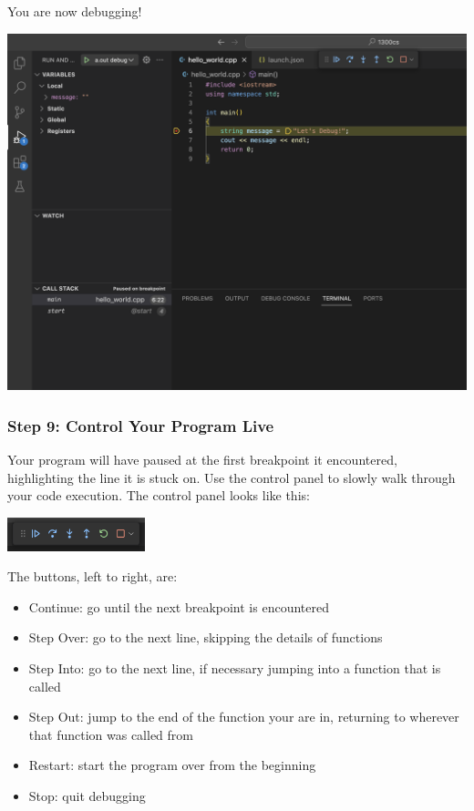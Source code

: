 You are now debugging!

\includegraphics[width=\textwidth]{images/macDebuggerSetup/debugger_mac_9.png}

\subsubsection{Step 9: Control Your Program Live}

Your program will have paused at the first breakpoint it encountered, highlighting the line it is stuck on. Use the control panel to slowly walk through your code execution. The control panel looks like this:

\includegraphics[width=0.3\textwidth]{images/macDebuggerSetup/debugger_mac_10.png}

The buttons, left to right, are:

\begin{itemize}
    \item Continue: go until the next breakpoint is encountered
    \item Step Over: go to the next line, skipping the details of functions
    \item Step Into: go to the next line, if necessary jumping into a function that is called
    \item Step Out: jump to the end of the function your are in, returning to wherever that function was called from
    \item Restart: start the program over from the beginning
    \item Stop: quit debugging
\end{itemize}

